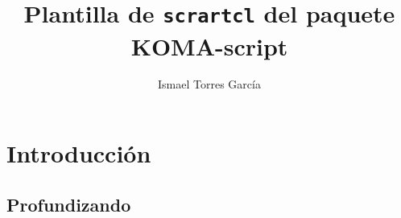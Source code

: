\documentclass{scrartcl}
\title{Plantilla de \texttt{scrartcl} del paquete KOMA-script}
\author{Ismael Torres García}
\begin{document}
\maketitle

\section{Introducción}
\lipsum[1-10]

\subsection{Profundizando}
\lipsum[1-10]
\end{document}
